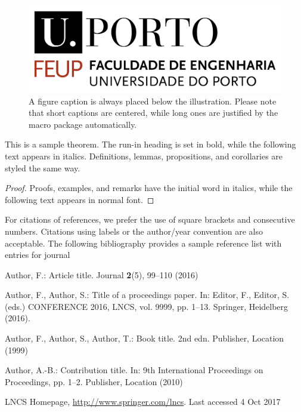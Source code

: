 \documentclass[runningheads]{llncs}
\begin{document}
\begin{figure}
\includegraphics[width=\textwidth]{img/FEUPlogo.png}
\caption{A figure caption is always placed below the illustration.
Please note that short captions are centered, while long ones are
justified by the macro package automatically.} \label{fig1}
\end{figure}

\begin{theorem}
This is a sample theorem. The run-in heading is set in bold, while
the following text appears in italics. Definitions, lemmas,
propositions, and corollaries are styled the same way.
\end{theorem}
%
%
\begin{proof}
Proofs, examples, and remarks have the initial word in italics,
while the following text appears in normal font.
\end{proof}
For citations of references, we prefer the use of square brackets
and consecutive numbers. Citations using labels or the author/year
convention are also acceptable. The following bibliography provides
a sample reference list with entries for journal
%
%
%
% 
% 
%
\begin{thebibliography}{8}
Author, F.: Article title. Journal \textbf{2}(5), 99--110 (2016)

Author, F., Author, S.: Title of a proceedings paper. In: Editor,
F., Editor, S. (eds.) CONFERENCE 2016, LNCS, vol. 9999, pp. 1--13.
Springer, Heidelberg (2016). 

Author, F., Author, S., Author, T.: Book title. 2nd edn. Publisher,
Location (1999)

Author, A.-B.: Contribution title. In: 9th International Proceedings
on Proceedings, pp. 1--2. Publisher, Location (2010)

LNCS Homepage, \url{http://www.springer.com/lncs}. Last accessed 4
Oct 2017
\end{thebibliography}
\end{document}
